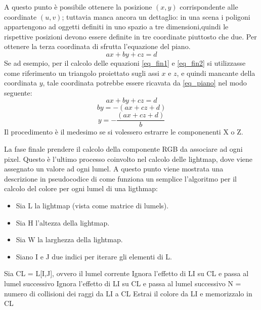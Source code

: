 A questo punto è possibile ottenere la posizione $(x,y)$ corrispondente alle coordinate $(u,v)$; tuttavia  manca ancora un dettaglio: in una scena i poligoni appartengono ad oggetti definiti in uno spazio a tre dimensioni,quindi le rispettive posizioni devono essere definite in tre coordinate piuttosto che due. 
Per ottenere la terza coordinata di sfrutta l’equazione del piano. 
\begin{equation}
ax + by + cz = d
\label{eq_piano}
\end{equation}
Se ad esempio, per il calcolo delle equazioni \ref{eq_fin1} e \ref{eq_fin2} si utilizzasse come riferimento un triangolo proiettato sugli assi $x$ e $z$, e quindi mancante della coordinata $y$, tale coordinata potrebbe essere ricavata da \ref{eq_piano} nel modo seguente:
\begin{equation}
ax + by + cz = d
\end{equation}
\begin{equation}
by = -(ax + cz + d)
\end{equation}
\begin{equation}
y = - \frac{(ax + cz + d)}{b}
\end{equation}
Il procedimento è il medesimo se si volessero estrarre le componenenti X o Z.

La fase finale prendere il calcolo della componente RGB da associare ad ogni pixel.
Questo è l’ultimo processo coinvolto nel calcolo delle lightmap, dove viene assegnato un valore ad ogni lumel. A questo punto viene mostrata una descrizione in pseudocodice di come funziona un semplice l’algoritmo per il calcolo del colore per ogni lumel di una ligthmap:

\begin{itemize}
\item Sia L la lightmap (vista come matrice di lumels).
\item Sia H l'altezza della lightmap.
\item Sia W la larghezza della lightmap.
\item Siano I e J due indici per iterare gli elementi di L.
\end{itemize}
 
\begin{algorithm}[H]
  {
   { 
   Sia CL = L[I,J], ovvero il lumel corrente\;
    {
     {
     Ignora l'effetto di LI su CL e passa al lumel successivo\;
     }
	 {
     Ignora l'effetto di LI su CL e passa al lumel successivo\;
     }
	 {
     N = numero di collisioni dei raggi da LI a CL\;
     }
	 {
     Estrai il colore da LI e memorizzalo in CL\;
     }
    }
   }
  }
\end{algorithm}

